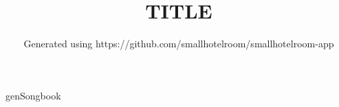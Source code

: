 \documentclass[11pt,a4paper,openany]{book}  %
\begin{document}
\frontmatter

\Large

\title{TITLE}
\author{Generated using https://github.com/smallhotelroom/smallhotelroom-app}

\maketitle
\cleardoublepage
\tableofcontents
\newpage

\mainmatter

genSongbook

\backmatter

\end{document}
